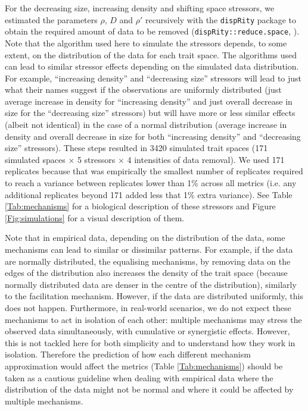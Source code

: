 \documentclass[12pt,letterpaper]{article}
\begin{document}
For the decreasing size, increasing density and shifting space stressors, we estimated the parameters $\rho$, $D$ and $\rho'$ recursively with the \texttt{dispRity} package to obtain the required amount of data to be removed (\texttt{dispRity::reduce.space}, \citealt{guillerme2018disprity,guillerme2020shifting}).
Note that the algorithm used here to simulate the stressors depends, to some extent, on the distribution of the data for each trait space.
The algorithms used can lead to similar stressor effects depending on the simulated data distribution.
For example, ``increasing density'' and ``decreasing size'' stressors will lead to just what their names suggest if the observations are uniformly distributed (just average increase in density for ``increasing density'' and just overall decrease in size for the ``decreasing size'' stressors) but will have more or less similar effects (albeit not identical) in the case of a normal distribution (average increase in density and overall decrease in size for both ``increasing density'' and ``decreasing size'' stressors).
These steps resulted in 3420 simulated trait spaces (171 simulated spaces $\times$ 5 stressors $\times$ 4 intensities of data removal).
We used 171 replicates because that was empirically the smallest number of replicates required to reach a variance between replicates lower than 1\% across all metrics (i.e. any additional replicates beyond 171 added less that 1\% extra variance).
See Table \ref{Tab:mechanisms} for a biological description of these stressors and Figure \ref{Fig:simulations} for a visual description of them.

Note that in empirical data, depending on the distribution of the data, some mechanisms can lead to similar or dissimilar patterns.
For example, if the data are normally distributed, the equalising mechanisms, by removing data on the edges of the distribution also increases the density of the trait space (because normally distributed data are denser in the centre of the distribution), similarly to the facilitation mechanism.
However, if the data are distributed uniformly, this does not happen.
Furthermore, in real-world scenarios, we do not expect these mechanisms to act in isolation of each other: multiple mechanisms may stress the observed data simultaneously, with cumulative or synergistic effects.
However, this is not tackled here for both simplicity and to understand how they work in isolation. 
Therefore the prediction of how each different mechanism approximation would affect the metrics (Table \ref{Tab:mechanisms}) should be taken as a cautious guideline when dealing with empirical data where the distribution of the data might not be normal and where it could be affected by multiple mechanisms.
\end{document}
